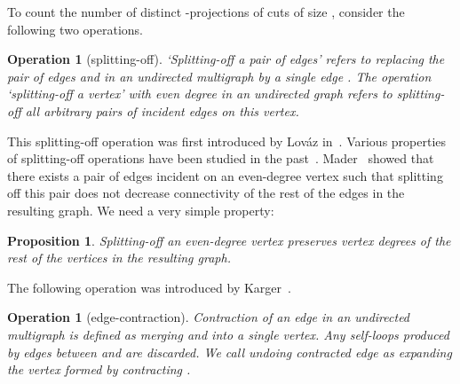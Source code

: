 \documentclass[11pt]{article}
\newtheorem{proposition}[theorem]{Proposition}
\newtheorem{operation}[theorem]{Operation}
\begin{document}
\noindent To count the number of distinct -projections of cuts of size , consider the following two operations.
\begin{operation}[splitting-off]
  \textit{`Splitting-off a pair of edges'} refers to replacing the pair of edges  and  in an undirected multigraph by a single edge . 
  The operation \textit{`splitting-off a vertex'} with even degree in an undirected graph refers to splitting-off all arbitrary pairs of incident edges on this vertex.  
\end{operation}
This splitting-off operation was first introduced by Lov\'{a}z in~\cite{lovasz1993book}. 
Various properties of splitting-off operations have been studied in the past~\cite{mader1978reduction, babai1986complexity}. 
Mader~\cite{mader1978reduction} showed that there exists a pair of edges incident on an even-degree vertex such that splitting off this pair does not decrease connectivity of the rest of the edges in the resulting graph. 
We need a very simple property:
\begin{proposition} 
Splitting-off an even-degree vertex preserves vertex degrees of the rest of the vertices in the resulting graph. 
\end{proposition}

\noindent The following operation was introduced by Karger~\cite{karger1993soda}. 
\begin{operation}[edge-contraction]
  Contraction of an edge  in an undirected multigraph is defined as merging  and  into a single vertex.
  Any self-loops produced by edges between  and  are discarded. 
  We call undoing contracted edge  as \textit{expanding} the vertex formed by contracting . 
\end{operation}
\end{document}
